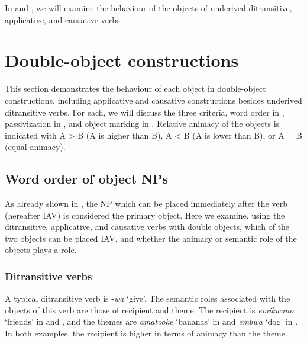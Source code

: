 \documentclass[output=paper,
            colorlinks, citecolor=brown
            ,draftmode
		  ]{langscibook}
\begin{document}
In  and , we will examine the behaviour of the objects of underived ditransitive, applicative, and causative verbs.



\section{Double-object constructions}\label{sec:yoneda:3}


This section demonstrates the behaviour of each object in double-object constructions, including applicative and causative constructions besides underived ditransitive verbs. For each, we will discuss the three criteria, word order in , passivization in , and object marking in . Relative animacy of the objects is indicated with A > B (A is higher than B), A < B (A is lower than B), or A = B (equal animacy).


\subsection{Word order of object NPs}\label{sec:yoneda:3.1}



As already shown in , the NP which can be placed immediately after the verb (hereafter IAV) is considered the primary object. Here we examine, using the ditransitive, applicative, and causative verbs with double objects, which of the two objects can be placed IAV, and whether the animacy or semantic role of the objects plays a role. 



\subsubsection{Ditransitive verbs}\label{sec:yoneda:3.1.1}



A typical ditransitive verb is -\textit{wa} ‘give’. The semantic roles associated with the objects of this verb are those of recipient and theme. The recipient is \textit{emikwano} ‘friends’ in  and , and the themes are \textit{amatooke} ‘bananas’ in  and \textit{embwa} ‘dog’ in . In both examples, the recipient is higher in terms of animacy than the theme.      
\end{document}
